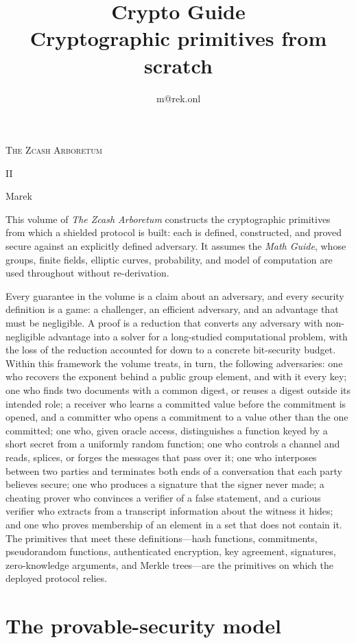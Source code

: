 \documentclass[11pt,a4paper]{article}
\title{\textbf{\Huge Crypto Guide}\\[6pt]\large Cryptographic primitives from scratch}
\author{m@rek.onl}
\date{}
\makeatletter
\theoremstyle{definition}
\let\arb@tableofcontents\tableofcontents
\renewcommand{\tableofcontents}{{\hypersetup{pdfborderstyle={/S/U/W 0}}%
  \arb@tableofcontents}}
\providecommand{\accession}{}
\def\arb@name#1#2\@nil{\def\arbvolname{#2}}
\def\arb@parsetitle\textbf#1\\[#2]#3#4\@nil{\arb@name#1\@nil\def\arb@sub{#4}}
\providecommand{\arbvolname}{}
\renewcommand{\maketitle}{\expandafter\arb@parsetitle\@title\@nil
  \hypersetup{pdftitle={\arbvolname: \arb@sub},pdfauthor={Marek}}%
  \thispagestyle{empty}\begingroup\raggedright
  {\fontsize{13.2}{16}\selectfont\scshape The Zcash Arboretum\par}
  \vspace*{50mm}
  {\fontsize{47.3}{50}\selectfont\accession\par}
  \vspace{6mm}
  {\fontsize{22.8}{27}\selectfont\arbvolname\par}
  \vspace{3mm}
  {\fontsize{13.2}{17}\selectfont\arb@sub\par}
  \vspace{18mm}
  {\fontsize{13.2}{17}\selectfont Marek\par}
  {\small\@author\par}
  \endgroup\clearpage}
\theoremstyle{remark}
\renewenvironment{abstract}{%
  \small\begin{center}{\bfseries\abstractname}\end{center}\medskip\noindent\ignorespaces
}{\par\medskip}
\renewcommand{\accession}{II}
\makeatother
\begin{document}
\maketitle

\begin{abstract}
This volume of \emph{The Zcash Arboretum} constructs the cryptographic
primitives from which a shielded protocol is built: each is defined,
constructed, and proved secure against an explicitly defined adversary. It
assumes the \emph{Math Guide}, whose groups, finite fields, elliptic curves,
probability, and model of computation are used throughout without
re-derivation.

Every guarantee in the volume is a claim about an adversary, and every
security definition is a game: a challenger, an efficient adversary, and an
advantage that must be negligible. A proof is a reduction that converts any
adversary with non-negligible advantage into a solver for a long-studied
computational problem, with the loss of the reduction accounted for down to a
concrete bit-security budget. Within this framework the volume treats, in turn,
the following adversaries: one who recovers the exponent
behind a public group element, and with it every key; one who finds two
documents with a common digest, or reuses a digest outside its intended role;
a receiver who learns a committed value before the commitment is opened, and a
committer who opens a commitment to a value other than the one committed; one
who, given oracle access, distinguishes a function keyed by a short secret from
a uniformly random function; one who controls a channel and reads, splices, or
forges the messages that pass over it; one who interposes between two parties
and terminates both ends of a conversation that each party believes secure; one
who produces a signature that the signer never made; a cheating
prover who convinces a verifier of a false statement, and a curious verifier who
extracts from a transcript information about the witness it hides; and one who
proves membership of an element in a set that does not contain it. The
primitives that meet these definitions---hash functions, commitments,
pseudorandom functions, authenticated encryption, key agreement, signatures,
zero-knowledge arguments, and Merkle trees---are the primitives on which the
deployed protocol relies.
\end{abstract}


\clearpage
\tableofcontents
\clearpage

\section{The provable-security model}\label{sec:model}
\end{document}
